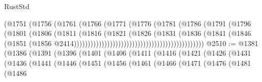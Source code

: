 \begin{lexlean}{RustStd}
\begin{coremodule}
                                                      (@1751
                                                        (@1756
                                                          (@1761
                                                            (@1766
                                                              (@1771
                                                                (@1776
                                                                  (@1781
                                                                    (@1786
                                                                      (@1791
                                                                        (@1796
                                                                          (@1801
                                                                            (@1806
                                                                              (@1811
                                                                                (@1816
                                                                                  (@1821
                                                                                    (@1826
                                                                                      (@1831
                                                                                        (@1836
                                                                                          (@1841
                                                                                            (@1846
                                                                                              (@1851
                                                                                                (@1856
                                                                                                  @2414)))))))))))))))))))))))))))))))))))))))))))))))
@2510 := @1381
    (@1386
      (@1391
        (@1396
          (@1401
            (@1406
              (@1411
                (@1416
                  (@1421
                    (@1426
                      (@1431
                        (@1436
                          (@1441
                            (@1446
                              (@1451
                                (@1456
                                  (@1461
                                    (@1466
                                      (@1471
                                        (@1476
                                          (@1481
                                            (@1486

\end{coremodule}
\end{lexlean}
